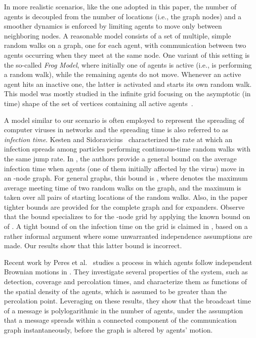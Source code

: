 \documentclass[11pt]{article}
\begin{document}
In more realistic scenarios, like the one adopted in this paper, the
number of agents is decoupled from the number of locations (i.e., the
graph nodes) and a smoother dynamics is enforced by limiting agents to
move only between neighboring nodes. A reasonable model consists of
a set of multiple, simple random walks on a graph, one for each agent,
with communication between two agents occurring when they meet at the
same node.  One variant of this setting is the so-called \emph{Frog
  Model},
where initially one of  agents is active (i.e., is performing a
random walk), while the remaining agents do not move.  Whenever an
active agent hits an inactive one, the latter is activated and starts
its own random walk.  This model was mostly studied in the infinite
grid focusing on the asymptotic (in time) shape of the set of vertices
containing all active agents~\cite{AlvesMP02, KestenS03}.

A model similar to our scenario is often employed to represent the
spreading of computer viruses in networks and the spreading time is
also referred to as \emph{infection time}.  Kesten and
Sidoravicius~\cite{KestenS05} characterized the rate at which an
infection spreads among particles
performing continuous-time random walks with the same jump
rate.  In \cite{DimitriouNS06}, the authors provide a general bound on
the average infection time when  agents (one of them initially
affected by the virus) move in an -node graph.  For general graphs,
this bound is , where  denotes the maximum
average meeting time of two random walks on the graph, and the maximum
is taken over all pairs of starting locations of the random walks.
Also, in the paper tighter bounds are provided for the complete graph
and for expanders. Observe that the  bound
specializes to  for the -node grid by
applying the known bound on  of \cite{AldousF98}.  A tight bound
of  on the infection time on the grid is
claimed in \cite{WangKK08}, based on a rather informal argument where
some unwarranted independence assumptions are made.  Our results show
that this latter bound is incorrect.

Recent work by Peres et al.~\cite{PeresSSS11} studies a process in
which agents follow independent Brownian motions in .  They
investigate several properties of the system, such as detection,
coverage and percolation times, and characterize them as functions of
the spatial density of the agents, which is assumed to be greater than
the percolation point.  Leveraging on these results, they show that
the broadcast time of a message is polylogarithmic in the number of
agents, under the assumption that a message spreads within a connected
component of the communication graph instantaneously, before the graph
is altered by agents' motion.
\end{document}
